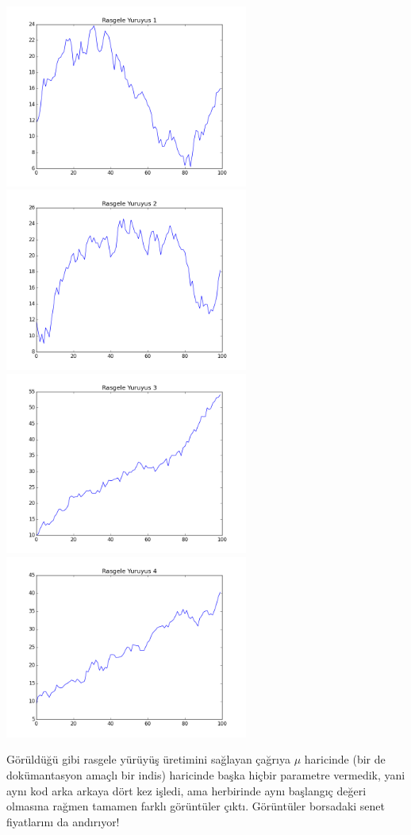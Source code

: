 \documentclass[12pt,fleqn]{article}\usepackage{../../common}
\begin{document}
\includegraphics[height=6cm]{tser_stoc_01.png}
\includegraphics[height=6cm]{tser_stoc_02.png}
\includegraphics[height=6cm]{tser_stoc_03.png}
\includegraphics[height=6cm]{tser_stoc_04.png}

Görüldüğü gibi rasgele yürüyüş üretimini sağlayan çağrıya $\mu$ haricinde (bir
de dokümantasyon amaçlı bir indis) haricinde başka hiçbir parametre vermedik,
yani aynı kod arka arkaya dört kez işledi, ama herbirinde aynı başlangıç değeri
olmasına rağmen tamamen farklı görüntüler çıktı. Görüntüler borsadaki senet
fiyatlarını da andırıyor!
\end{document}
